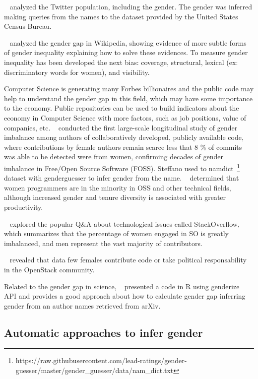 \documentclass[a4paper]{article}
\begin{document}
~\cite{mislove2011understanding} analyzed the Twitter population,
including the gender. The gender was inferred making queries
from the names to the dataset provided by the United States Census
Bureau.

~\cite{wagner2015s} analyzed the gender gap in Wikipedia,
showing evidence of more subtle forms of gender inequality explaining
how to solve these evidences. To measure gender inequality has been
developed the next bias: coverage, structural, lexical (ex:
discriminatory words for women), and visibility.

Computer Science is generating many Forbes billionaires and the public
code may help to understand the gender gap in this field, which may
have some importance to the economy. Public repositories can
be used to build indicators about the economy in Computer Science with
more factors, such as job positions, value of companies, etc.
~\cite{zacchiroli2020gender} conducted the first large-scale
longitudinal study of gender imbalance among authors of
collaboratively developed, publicly available code, where
contributions by female authors remain scarce less that 8 \% of
commits was able to be detected were from women, confirming decades of
gender imbalance in Free/Open Source Software (FOSS). Steffano used
to namdict~\footnote{https://raw.githubusercontent.com/lead-ratings/gender-guesser/master/gender\_guesser/data/nam\_dict.txt} dataset with genderguesser to infer gender from
the name. ~\cite{vasilescu2015gender} determined that women programmers
are in the minority in OSS and other technical fields, although increased
gender and tenure diversity is associated with greater productivity.

~\cite{vasilescu2012gender} explored the popular Q\&A about
technological issues called StackOverflow, which summarizes that the
percentage of women engaged in SO is greatly imbalanced, and men
represent the vast majority of contributors.

~\cite{izquierdo2018openstack} revealed that data few females
contribute code or take political responsability in the OpenStack community.

Related to the gender gap in science, ~\cite{holman2018gender} presented a
code in R using genderize API and provides a good approach about how to
calculate gender gap inferring gender from an author names retrieved from
arXiv.

\subsection{Automatic approaches to infer gender}
\end{document}
